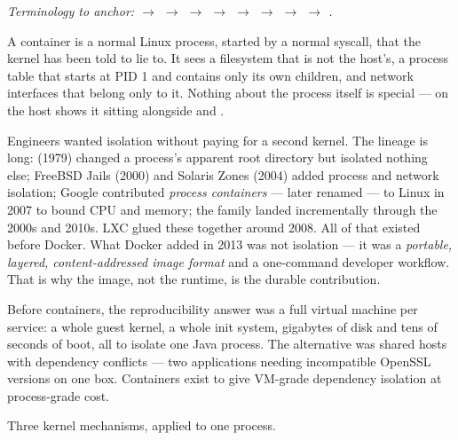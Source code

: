 \begin{center}\small\itshape\color{cInk!70}
Terminology to anchor:  $\rightarrow$  $\rightarrow$  $\rightarrow$  $\rightarrow$  $\rightarrow$  $\rightarrow$  $\rightarrow$  $\rightarrow$ .
\end{center}



 A container is a normal Linux process, started by a normal  syscall, that the kernel has been told to lie to. It sees a filesystem that is not the host's, a process table that starts at PID 1 and contains only its own children, and network interfaces that belong only to it. Nothing about the process itself is special ---  on the host shows it sitting alongside  and .

 Engineers wanted isolation without paying for a second kernel. The lineage is long:  (1979) changed a process's apparent root directory but isolated nothing else; FreeBSD Jails (2000) and Solaris Zones (2004) added process and network isolation; Google contributed \emph{process containers} --- later renamed  --- to Linux in 2007 to bound CPU and memory; the  family landed incrementally through the 2000s and 2010s. LXC glued these together around 2008. All of that existed before Docker. What Docker added in 2013 was not isolation --- it was a \emph{portable, layered, content-addressed image format} and a one-command developer workflow. That is why the image, not the runtime, is the durable contribution.

\begin{whyexists}
Before containers, the reproducibility answer was a full virtual machine per service: a whole guest kernel, a whole init system, gigabytes of disk and tens of seconds of boot, all to isolate one Java process. The alternative was shared hosts with dependency conflicts --- two applications needing incompatible OpenSSL versions on one box. Containers exist to give VM-grade dependency isolation at process-grade cost.
\end{whyexists}

 Three kernel mechanisms, applied to one process.


